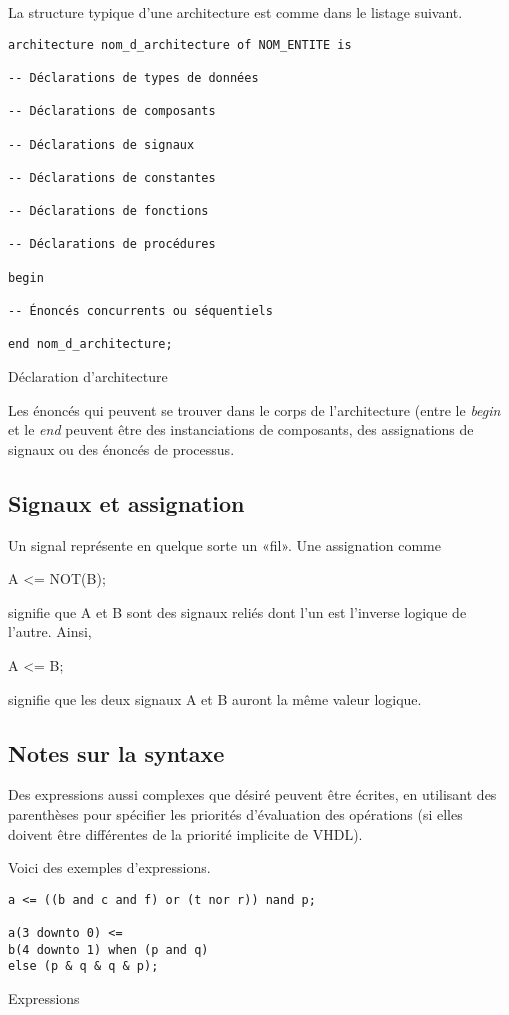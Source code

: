 \documentclass[11pt]{article}
\begin{document}
La structure typique d'une architecture est comme dans le listage suivant.

\begin{listing}[htbp]
\begin{verbatim}
architecture nom_d_architecture of NOM_ENTITE is

-- Déclarations de types de données

-- Déclarations de composants

-- Déclarations de signaux

-- Déclarations de constantes

-- Déclarations de fonctions

-- Déclarations de procédures

begin

-- Énoncés concurrents ou séquentiels

end nom_d_architecture;
\end{verbatim}
\caption{Déclaration d'architecture}
\end{listing}

Les énoncés qui peuvent se trouver dans le corps de l'architecture
(entre le \emph{begin} et le \emph{end} peuvent être des instanciations de
composants, des assignations de signaux ou des énoncés de processus.

\subsection{Signaux et assignation}
\label{sec:org5480887}

Un signal représente en quelque sorte un «fil». Une assignation comme

A <= NOT(B);

signifie que A et B sont des signaux reliés dont l'un est l'inverse
logique de l'autre.  Ainsi,

A <= B; 

signifie que les deux signaux A et B auront la même valeur logique.

\subsection{Notes sur la syntaxe}
\label{sec:org98a625c}

Des expressions aussi complexes que désiré peuvent être écrites, en
utilisant des parenthèses pour spécifier les priorités d'évaluation
des opérations (si elles doivent être différentes de la priorité
implicite de VHDL).

Voici des exemples d'expressions.
\begin{listing}[htbp]
\begin{verbatim}
a <= ((b and c and f) or (t nor r)) nand p;

a(3 downto 0) <=
b(4 downto 1) when (p and q)
else (p & q & q & p);
\end{verbatim}
\caption{Expressions}
\end{listing}
\end{document}
